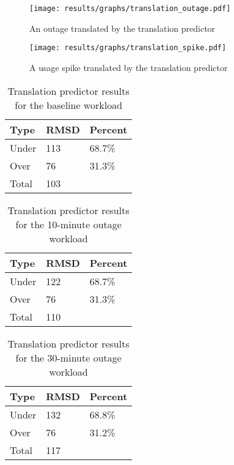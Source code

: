 \begin{figure}
\centering
\texttt{[image: results/graphs/translation\_outage.pdf]}
\caption{An outage translated by the translation predictor}
\label{fig:translation_outage}
\end{figure}

\begin{figure}
\centering
\texttt{[image: results/graphs/translation\_spike.pdf]}
\caption{A usage spike translated by the translation predictor}
\label{fig:translation_spike}
\end{figure}

\begin{table}[H]
\centering
\begin{tabular}{| l | l | l |}
\hline
Type & RMSD & Percent \\ \hline
Under & 113 & 68.7\% \\ \hline
Over & 76 & 31.3\% \\ \hline
Total & 103 & \\ \hline
\end{tabular}
\caption{Translation predictor results for the baseline workload}
\end{table}


\begin{table}[H]
\centering
\begin{tabular}{| l | l | l |}
\hline
Type & RMSD & Percent \\ \hline
Under & 122 & 68.7\% \\ \hline
Over & 76 & 31.3\% \\ \hline
Total & 110 & \\ \hline
\end{tabular}
\caption{Translation predictor results for the 10-minute outage workload}
\end{table}

\begin{table}[H]
\centering
\begin{tabular}{| l | l | l |}
\hline
Type & RMSD & Percent \\ \hline
Under & 132 & 68.8\% \\ \hline
Over & 76 & 31.2\% \\ \hline
Total & 117 & \\ \hline
\end{tabular}
\caption{Translation predictor results for the 30-minute outage workload}
\end{table}

